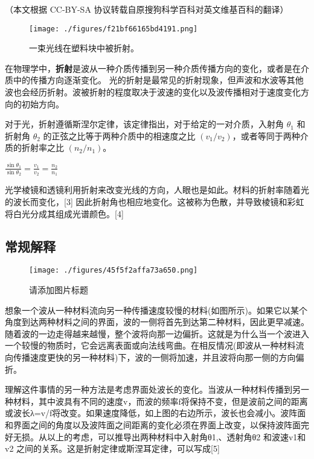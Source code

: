 
（本文根据 CC-BY-SA 协议转载自原搜狗科学百科对英文维基百科的翻译）

\begin{figure}[ht]
\centering
\texttt{[image: ./figures/f21bf66165bd4191.png]}
\caption{一束光线在塑料块中被折射。} \label{fig_ZS_1}
\end{figure}

在物理学中，\textbf{折射}是波从一种介质传播到另一种介质传播方向的变化，或者是在介质中的传播方向逐渐变化。 光的折射是最常见的折射现象，但声波和水波等其他波也会经历折射。波被折射的程度取决于波速的变化以及波传播相对于速度变化方向的初始方向。

对于光，折射遵循斯涅尔定律，该定律指出，对于给定的一对介质，入射角 $\theta_1$ 和折射角 $\theta_2$ 的正弦之比等于两种介质中的相速度之比 $(v_1 / v_2)$，或者等同于两种介质的折射率之比 $(n_2 / n_1)$。

$\frac{\sin \theta_1}{\sin \theta_2} = \frac{v_1}{v_2} = \frac{n_2}{n_1}$

光学棱镜和透镜利用折射来改变光线的方向，人眼也是如此。材料的折射率随着光的波长而变化，[3] 因此折射角也相应地变化。这被称为色散，并导致棱镜和彩虹将白光分成其组成光谱颜色。[4]

\subsection{常规解释}

\begin{figure}[ht]
\centering
\texttt{[image: ./figures/45f5f2affa73a650.png]}
\caption{请添加图片标题} \label{fig_ZS_2}
\end{figure}

想象一个波从一种材料流向另一种传播速度较慢的材料(如图所示)。如果它以某个角度到达两种材料之间的界面，波的一侧将首先到达第二种材料，因此更早减速。随着波的一边走得越来越慢，整个波将向那一边偏折。这就是为什么当一个波进入一个较慢的物质时，它会远离表面或向法线弯曲。在相反情况(即波从一种材料流向传播速度更快的另一种材料)下，波的一侧将加速，并且波将向那一侧的方向偏折。

理解这件事情的另一种方法是考虑界面处波长的变化。当波从一种材料传播到另一种材料，其中波具有不同的速度v，而波的频率f将保持不变，但是波前之间的距离或波长λ=v/f将改变。如果速度降低，如上图的右边所示，波长也会减小。波阵面和界面之间的角度以及波阵面之间距离的变化必须在界面上改变，以保持波阵面完好无损。从以上的考虑，可以推导出两种材料中入射角θ1,、透射角θ2 和波速v1和v2 之间的关系。这是折射定律或斯涅耳定律，可以写成[5]
